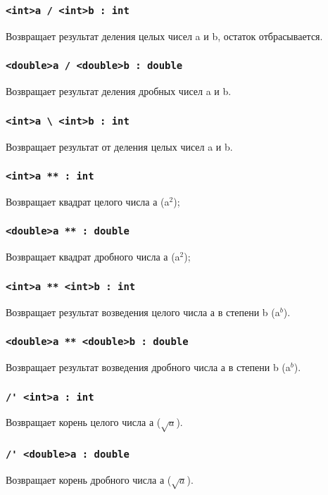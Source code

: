 \documentclass[a4paper, 14pt]{extarticle}
\begin{document}
\subsubsection{\lstinline`<int>a / <int>b : int`}
	Возвращает результат деления целых чисел a и b, остаток отбрасывается.

\subsubsection{\lstinline`<double>a / <double>b : double`}
	Возвращает результат деления дробных чисел a и b.

\subsubsection{\lstinline`<int>a \ <int>b : int`}
	Возвращает результат от деления целых чисел a и b.


\subsubsection{\lstinline`<int>a ** : int`}
	Возвращает квадрат целого числа а (a$^2$);

\subsubsection{\lstinline`<double>a ** : double`}
	Возвращает квадрат дробного числа а (a$^2$);

\subsubsection{\lstinline`<int>a ** <int>b : int`}
	Возвращает результат возведения целого числа а в степени b (a$^b$).

\subsubsection{\lstinline`<double>a ** <double>b : double`}
	Возвращает результат возведения дробного числа а в степени b (a$^b$).

\subsubsection{\lstinline`/' <int>a : int`}
	Возвращает корень целого числа а ($\sqrt{a}$).

\subsubsection{\lstinline`/' <double>a : double`}
	Возвращает корень дробного числа а ($\sqrt{a}$).
\end{document}
